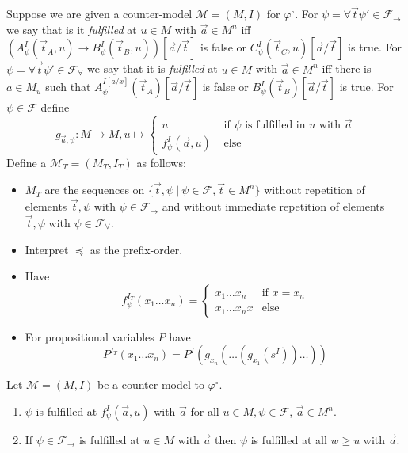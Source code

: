 \documentclass[a4paper,UKenglish,cleveref, autoref, thm-restate]{lipics-v2021}
\begin{document}
\begin{definition}
	Suppose we are given a counter-model $\mathcal M = (M, I)$ for $\varphi^\circ$. For $\psi = \forall\vec t\psi'\in\mathcal F_\to$ we say that is it \textit{fulfilled} at $u\in M$ with $\vec a\in M^n$ iff $(A_\psi^I(\vec t_A, u)\to B_\psi^I(\vec t_B, u))[\vec a/\vec t]$ is false or $C_\psi^I(\vec t_C, u)[\vec a/\vec t]$ is true.
	For $\psi = \forall\vec t\psi'\in\mathcal F_\forall$ we say that it is \textit{fulfilled} at $u\in M$ with $\vec a\in M^n$ iff there is $a\in M_u$ such that $A^{I[a/x]}_\psi(\vec t_A)[\vec a/\vec t]$ is false or $B_\psi^I(\vec t_B)[\vec a/\vec t]$ is true. For $\psi\in\mathcal F$ define $$g_{\vec a, \psi} : M\to M, u\mapsto\begin{cases}
		u&\text{ if $\psi$ is fulfilled in $u$ with $\vec a$}\\
		f^I_\psi(\vec a, u)&\text{ else}		
	\end{cases}$$		
	Define a $\mathcal M_T = (M_T, I_T)$ as follows:
	\begin{itemize}
		\item $M_T$ are the sequences on $\{ \vec t, \psi\:|\:\psi\in \mathcal F, \vec t\in M^n\}$ without repetition of elements $\vec t,\psi$ with $\psi\in\mathcal F_\to$ and without immediate repetition of elements $\vec t,\psi$ with $\psi\in\mathcal F_\forall$.
		\item Interpret $\preceq$ as the prefix-order.
		\item Have $$f_\psi^{I_T}(x_1\dots x_n) = \begin{cases}
			x_1\dots x_n&\text{if $x=x_n$}\\
			x_1\dots x_nx&\text{else}			
		\end{cases}$$
		\item For propositional variables $P$ have $$P^{I_T}(x_1\dots x_n) = P^I(g_{x_n}(\dots(g_{x_1}(s^I))\dots))$$
	\end{itemize}
\end{definition}

\begin{lemma}
	Let $\mathcal M = (M, I)$ be a counter-model to $\mathcal \varphi^\circ$.
	\begin{enumerate}
		\item $\psi$ is fulfilled at $f_\psi^I(\vec a, u)$ with $\vec a$ for all $u\in M, \psi\in\mathcal F$, $\vec a\in M^n$.
		\item If $\psi\in\mathcal F_\to$ is fulfilled at $u\in M$ with $\vec a$ then $\psi$ is fulfilled at all $w\geq u$ with $\vec a$.
	\end{enumerate}	
\end{lemma}
\end{document}
